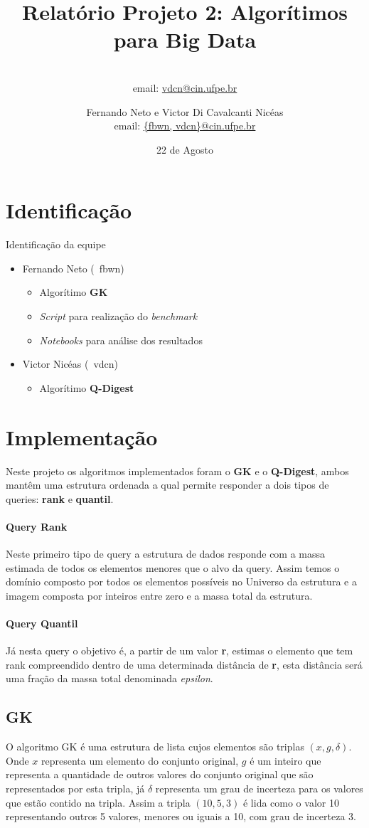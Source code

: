 \documentclass[11pt]{article}
\title{\textbf{Relatório Projeto 2: Algorítimos para Big Data}}
\author{ \\ email: \href{mailto:@cin.ufpe.br}{vdcn@cin.ufpe.br}}
\author{Fernando Neto e Victor Di Cavalcanti Nicéas \\ email: \href{mailto:fbwn@cin.ufpe.br}{\{fbwn, vdcn\}@cin.ufpe.br}}
\date{22 de Agosto}
\begin{document}
\maketitle

\section{Identificação}
Identificação da equipe
\begin{itemize}
  \item Fernando Neto (~fbwn)
  \begin{itemize}
    \item Algorítimo \textbf{GK}
    \item \emph{Script} para realização do \emph{benchmark}
    \item \emph{Notebooks} para análise dos resultados
  \end{itemize}
  \item Victor Nicéas (~vdcn)
  \begin{itemize}
    \item Algorítimo \textbf{Q-Digest}
  \end{itemize}
\end{itemize}
\section{Implementação}
Neste projeto os algoritmos implementados foram o \textbf{GK} e o \textbf{Q-Digest}, ambos mantêm uma estrutura ordenada a qual permite responder a dois tipos de queries: \textbf{rank} e \textbf{quantil}.
\paragraph{Query Rank}
Neste primeiro tipo de query a estrutura de dados responde com a massa estimada de todos os elementos menores que o alvo da query. Assim temos o domínio composto por todos os elementos possíveis no Universo da estrutura e a imagem composta por inteiros entre zero e a massa total da estrutura.
\paragraph{Query Quantil}
Já nesta query o objetivo é, a partir de um valor \textbf{r}, estimas o elemento que tem rank compreendido dentro de uma determinada distância de \textbf{r}, esta distância será uma fração da massa total denominada \emph{epsilon}.


\subsection{GK}
O algoritmo GK é uma estrutura de lista cujos elementos são triplas $(x, g, \delta)$. Onde $x$ representa um elemento do conjunto original, $g$ é um inteiro que representa a quantidade de outros valores do conjunto original que são representados por esta tripla, já $\delta$ representa um grau de incerteza para os valores que estão contido na tripla. Assim a tripla $(10, 5, 3)$ é lida como o valor 10 representando outros 5 valores, menores ou iguais a 10, com grau de incerteza 3.
\end{document}
